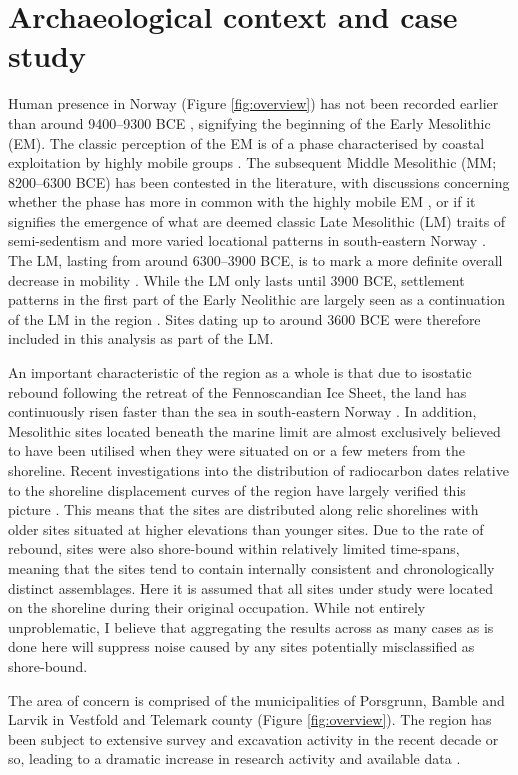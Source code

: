 \documentclass[12pt, a4paper]{article}
\begin{document}
\section{Archaeological context and case study}
Human presence in Norway (Figure \ref{fig:overview}) has not been recorded earlier than around 9400--9300 BCE \citep{damlien2017}, signifying the beginning of the Early Mesolithic (EM). The classic perception of the EM is of a phase characterised by coastal exploitation by highly mobile groups \citep[e.g.][]{bjerck2008, bang2012, fuglestvedt2012}. The subsequent Middle Mesolithic (MM; 8200--6300 BCE) has been contested in the literature, with discussions concerning whether the phase has more in common with the highly mobile EM \citep{mansrud2014}, or if it signifies the emergence of what are deemed classic Late Mesolithic (LM) traits of semi-sedentism and more varied locational patterns in south-eastern Norway \citep{solheim2016}. The LM, lasting from around 6300--3900 BCE, is to mark a more definite overall decrease in mobility \citep{bjerck2008, glorstad2010}. While the LM only lasts until 3900 BCE, settlement patterns in the first part of the Early Neolithic are largely seen as a continuation of the LM in the region \citep{glorstad2009}. Sites dating up to around 3600 BCE were therefore included in this analysis as part of the LM. \par
An important characteristic of the region as a whole is that due to isostatic rebound following the retreat of the Fennoscandian Ice Sheet, the land has continuously risen faster than the sea in south-eastern Norway \citep{sorensen2014}. In addition, Mesolithic sites located beneath the marine limit are almost exclusively believed to have been utilised when they were situated on or a few meters from the shoreline. Recent investigations into the distribution of radiocarbon dates relative to the shoreline displacement curves of the region have largely verified this picture \citep{breivik2018, solheim2020}. This means that the sites are distributed along relic shorelines with older sites situated at higher elevations than younger sites. Due to the rate of rebound, sites were also shore-bound within relatively limited time-spans, meaning that the sites tend to contain internally consistent and chronologically distinct assemblages. Here it is assumed that all sites under study were located on the shoreline during their original occupation. While not entirely unproblematic, I believe that aggregating the results across as many cases as is done here will suppress noise caused by any sites potentially misclassified as shore-bound. \par
The area of concern is comprised of the municipalities of Porsgrunn, Bamble and Larvik in Vestfold and Telemark county (Figure \ref{fig:overview}). The region has been subject to extensive survey and excavation activity in the recent decade or so, leading to a dramatic increase in research activity and available data \citep[e.g.][]{solheim2013, jaksland2014, melvold2014, reitan2014, solheim2017}.
\end{document}
